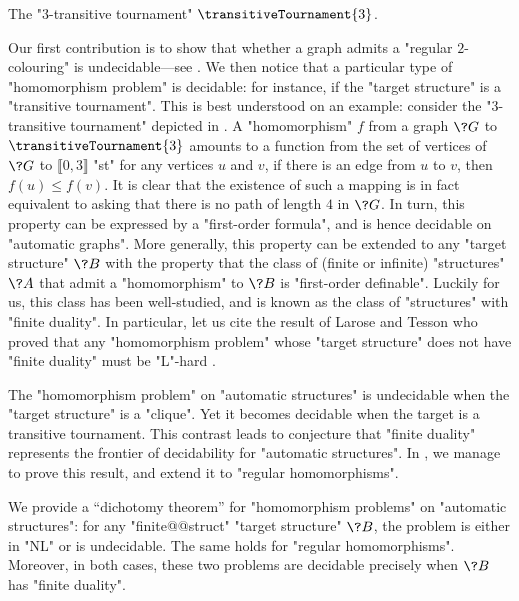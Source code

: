 \begin{marginfigure}
	\centering
	\begin{tikzpicture}
		
	\end{tikzpicture}
	\caption{
		\AP\label{fig:3-transitive-tournament}
		The "$3$-transitive tournament" $\transitiveTournament{3}$.
	}
\end{marginfigure}
Our first contribution is to show that whether a graph admits a "regular $2$-colouring" is undecidable---see . We then notice that a particular type of
"homomorphism problem" is decidable: for instance, if the "target structure"
is a "transitive tournament". This is best understood on an example: consider the "$3$-transitive 
tournament" depicted in .
A "homomorphism" $f$ from a graph $\?G$ to $\transitiveTournament{3}$ amounts to a function
from the set of vertices of $\?G$ to $\lBrack 0,3\rBrack$ "st"
for any vertices $u$ and $v$, if there is an edge from $u$ to $v$, then
$f(u) \leq f(v)$. It is clear that the existence of such a mapping is in fact equivalent 
to asking that there is no path of length $4$ in $\?G$.
In turn, this property can be expressed by a "first-order formula", and is hence decidable
on "automatic graphs".
More generally, this property can be extended to any "target structure" $\?B$ with the property
that the class of (finite or infinite) "structures" $\?A$ that admit a "homomorphism" to $\?B$
is "first-order definable".
Luckily for us, this class has been well-studied, and is known as the class of "structures"
with "finite duality". In particular, let us cite the result of Larose and Tesson
who proved that any "homomorphism problem" whose "target structure" does not have "finite duality"
must be "L"-hard \cite{LaroseTesson2009UniversalAlgebraCSP}.

The "homomorphism problem" on "automatic structures" 
is undecidable when the "target structure" is a "clique".
Yet it becomes decidable when the target is a transitive tournament.
This contrast leads to conjecture that "finite duality" represents the frontier of decidability for "automatic structures". In , we manage to prove this result, and extend it to "regular homomorphisms".

\begin{contribution}
	We provide a ``dichotomy theorem'' for "homomorphism problems" on "automatic structures":
	for any "finite@@struct" "target structure" $\?B$, the problem
	is either in "NL" or is undecidable. The same holds for "regular homomorphisms".
	Moreover, in both cases, these two problems are decidable precisely when $\?B$ has "finite duality".
\end{contribution}

